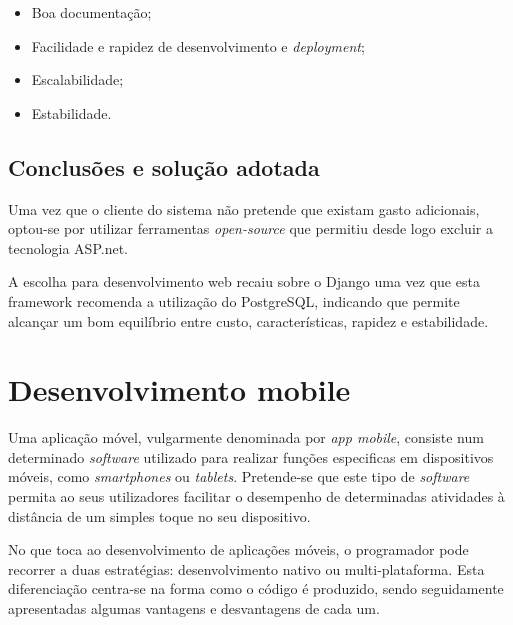 \begin{itemize}
	\item Boa documentação;
	\item Facilidade e rapidez de desenvolvimento e \textit{deployment};
	\item Escalabilidade;
	\item Estabilidade.

\end{itemize}





\subsection{Conclusões e solução adotada}



Uma vez que o cliente do sistema não pretende que existam gasto adicionais, optou-se por utilizar ferramentas \textit{open-source} que permitiu desde logo excluir a tecnologia ASP.net. 


A escolha para desenvolvimento web recaiu sobre o Django uma vez que esta framework recomenda a utilização do PostgreSQL, indicando que permite alcançar um bom equilíbrio entre custo, características, rapidez e estabilidade\cite{Holovaty2009}. 













\newpage
\section{Desenvolvimento mobile}


Uma aplicação móvel, vulgarmente denominada por \textit{app mobile}, consiste num determinado \textit{software} utilizado para realizar funções especificas em dispositivos móveis, como \textit{smartphones} ou \textit{tablets}. Pretende-se que este tipo de \textit{software} permita ao seus utilizadores facilitar o desempenho de determinadas atividades à distância de um simples toque no seu dispositivo. 

No que toca ao desenvolvimento de aplicações móveis, o programador pode recorrer a duas estratégias: desenvolvimento nativo ou multi-plataforma. Esta diferenciação centra-se na forma como o código é produzido, sendo seguidamente apresentadas algumas  vantagens e desvantagens de cada um. 


